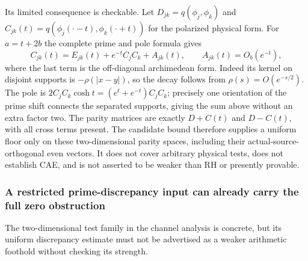 \documentclass[11pt]{article}
\theoremstyle{remark}
\begin{document}
Its limited consequence is checkable. Let
$D_{jk}=q(\phi_j,\phi_k)$ and
$C_{jk}(t)=q(\phi_j(\cdot-t),\phi_k(\cdot+t))$ for the polarized
physical form. For $a=t+2b$ the complete prime and pole formula gives
\[
 C_{jk}(t)=E_{jk}(t)+e^{-t}C_jC_k+A_{jk}(t),
 \qquad A_{jk}(t)=O_b(e^{-t}),
\]
where the last term is the off-diagonal archimedean form. Indeed its
kernel on disjoint supports is $-\rho(|x-y|)$, so the decay follows
from $\rho(s)=O(e^{-s/2})$. The pole is
$2C_jC_k\cosh t=(e^t+e^{-t})C_jC_k$; precisely one orientation of
the prime shift connects the separated supports, giving the sum above
without an extra factor two. The parity matrices are exactly
$D+C(t)$ and $D-C(t)$, with all cross terms present. The candidate
bound therefore supplies a uniform floor only on these two-dimensional
parity spaces, including their actual-source-orthogonal even vectors.
It does not cover arbitrary physical tests, does not establish CAE,
and is not asserted to be weaker than RH or presently provable.


\subsubsection*{A restricted prime-discrepancy input can already carry the full zero obstruction}
\label{sec:ns43-bump-strength}
The two-dimensional test family in the channel analysis is concrete,
but its uniform discrepancy estimate must not be advertised as a
weaker arithmetic foothold without checking its strength.
\end{document}
